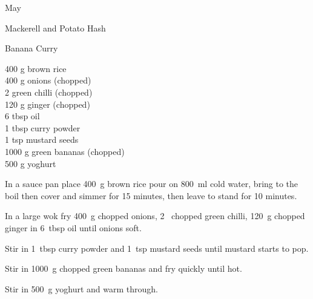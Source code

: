 \begin{menu}{May}
\begin{recipe}{2}{Mackerell and Potato Hash}
\begin{instructions}
    \end{instructions}
    \end{recipe}%
  
    \begin{recipe}{2}{Banana Curry}%
		\begin{ingredients}
		400 g brown rice  \\
	400 g onions (chopped) \\
	2  green chilli (chopped) \\
	120 g ginger (chopped) \\
	6 tbsp oil  \\
	1 tbsp curry powder  \\
	1 tsp mustard seeds  \\
	1000 g green bananas (chopped) \\
	500 g yoghurt  \\
	
		\end{ingredients}
	
    \begin{instructions}
    \item 
      In a
      sauce pan
      place
      400~g  brown rice
      pour on
      800~ml  cold water,
      bring to the boil then cover and simmer for 15 minutes,
      then leave to stand for 10 minutes.
    \item 
        In a large wok fry
        400~g chopped onions,
        2~ chopped green chilli,
        120~g chopped ginger
        in
        6~tbsp  oil
        until onions soft.
      \item 
        Stir in
        1~tbsp  curry powder
        and
        1~tsp  mustard seeds
        until mustard starts to pop.
      \item 
        Stir in
        1000~g chopped green bananas
        and fry quickly until hot.
      \item 
        Stir in 500~g  yoghurt and warm through.
      
    \end{instructions}
    \end{recipe}%
  

\end{menu}
